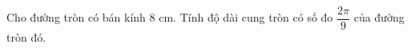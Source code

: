 \begin{ex}
Cho đường tròn có bán kính $8$ cm. Tính độ dài cung tròn có số đo $\dfrac{2\pi}{9}$ của đường tròn đó.
\end{ex}
